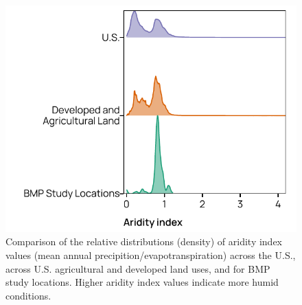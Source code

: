 \documentclass[utf8]{FrontiersinHarvard}
\begin{document}
\begin{figure}[p]
\includegraphics[width=0.5\linewidth,]{../figures/aridity_density} \caption{Comparison of the relative distributions (density) of aridity index values (mean annual precipition/evapotranspiration) across the U.S., across U.S. agricultural and developed land uses, and for BMP study locations. Higher aridity index values indicate more humid conditions.}\label{fig:aiindex}
\end{figure}
\end{document}
